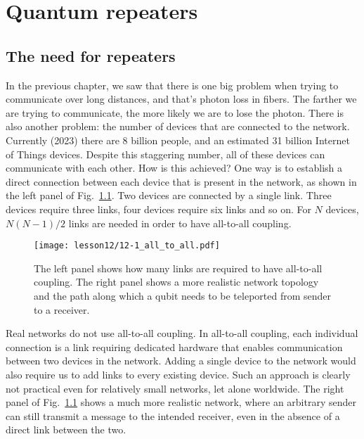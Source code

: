 \chapter{Quantum repeaters}
\label{sec:12_quantum_repeaters}
\label{sec:repeaters}

\section{The need for repeaters}
\label{sec:12-1_need_for_repeaters}

In the previous chapter, we saw that there is one big problem when trying to communicate over long distances, and that's photon loss in fibers.
The farther we are trying to communicate, the more likely we are to lose the photon.
There is also another problem: the number of devices that are connected to the network. Currently (2023) there are 8 billion people, and an estimated 31 billion Internet of Things devices.
Despite this staggering number, all of these devices can communicate with each other.
How is this achieved?
One way is to establish a direct connection between each device that is present in the network, as shown in the left panel of Fig.~\ref{fig:12-1_all_to_all}.
Two devices are connected by a single link.
Three devices require three links, four devices require six links and so on.
For $N$ devices, $N (N - 1) / 2$ links are needed in order to have all-to-all coupling.

\begin{figure}[t]
    \centering
    \texttt{[image: lesson12/12-1\_all\_to\_all.pdf]}
    \caption[All-to-all coupling between network nodes.]{The left panel shows how many links are required to have all-to-all coupling. The right panel shows a more realistic network topology and the path along which a qubit needs to be teleported from sender to a receiver.}
    \label{fig:12-1_all_to_all}
\end{figure}

Real networks do not use all-to-all coupling.
In all-to-all coupling, each individual connection is a link requiring dedicated hardware that enables communication between two devices in the network.
Adding a single device to the network would also require us to add links to every existing device.
Such an approach is clearly not practical even for relatively small networks, let alone worldwide.
The right panel of Fig.~\ref{fig:12-1_all_to_all} shows a much more realistic network, where an arbitrary sender can still transmit a message to the intended receiver, even in the absence of a direct link between the two.

